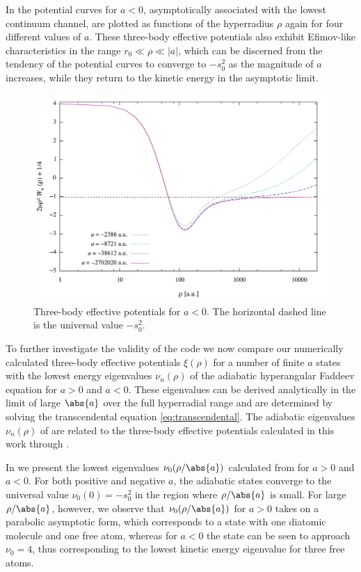 In  the potential curves for $a<0$, asymptotically associated with the lowest continuum channel, are plotted as functions of the hyperradius $\rho$ again for four different values of $a$. These three-body effective potentials also exhibit Efimov-like characteristics in the range $r_0 \ll \rho \ll |a|$, which can be discerned from the tendency of the potential curves to converge to $-s_0^2$ as the magnitude of $a$ increases, while they return to the kinetic energy in the asymptotic limit.

\begin{figure}[htbp!]
	\includegraphics[width=\linewidth]{finite_negative_a.pdf}
	\caption{Three-body effective potentials for $a<0$. The horizontal dashed line is the universal value $-s_0^2$.}
	\label{fig:res_3}
\end{figure}

To further investigate the validity of the code we now compare our numerically calculated three-body effective potentials $\xi(\rho)$ for a number of finite $a$ states with the lowest energy eigenvalues $\nu_n(\rho)$ of the adiabatic hyperangular Faddeev equation for $a>0$ and $a<0$. These eigenvalues can be derived analytically in the limit of large $\abs{a}$ over the full hyperradial range and are determined by solving the transcendental equation \eqref{eq:transcendental}. The adiabatic eigenvalues $\nu_n(\rho)$ of  are related to the three-body effective potentials calculated in this work through . 

In  we present the lowest eigenvalues $\nu_0(\rho/\abs{a})$ calculated from  for $a>0$ and $a<0$. For both positive and negative $a$, the adiabatic states converge to the universal value $\nu_0(0) = -s_0^2$ in the region where $\rho/\abs{a}$ is small. For large $\rho/\abs{a}$, however, we observe that $\nu_0(\rho/\abs{a})$ for $a>0$ takes on a parabolic asymptotic form, which corresponds to a state with one diatomic molecule and one free atom, whereas for $a<0$ the state can be seen to approach $\nu_0=4$, thus corresponding to the lowest kinetic energy eigenvalue for three free atoms.  

